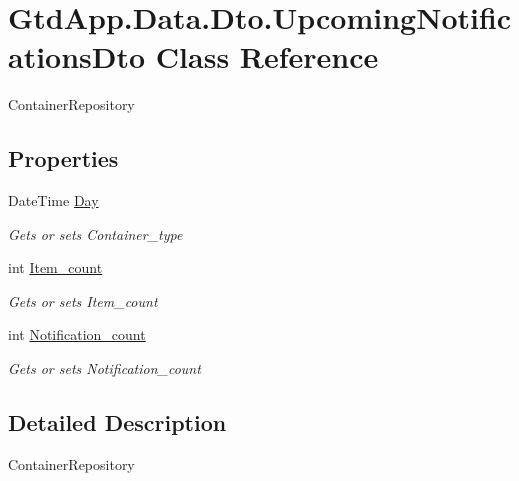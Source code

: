 \hypertarget{class_gtd_app_1_1_data_1_1_dto_1_1_upcoming_notifications_dto}{}\section{Gtd\+App.\+Data.\+Dto.\+Upcoming\+Notifications\+Dto Class Reference}
\label{class_gtd_app_1_1_data_1_1_dto_1_1_upcoming_notifications_dto}


Container\+Repository  


\subsection*{Properties}
\begin{DoxyCompactItemize}
\item 
Date\+Time \mbox{\hyperlink{class_gtd_app_1_1_data_1_1_dto_1_1_upcoming_notifications_dto_a553e1afb110f45555604ce1da782f741}{Day}}
\begin{DoxyCompactList}\small\item\em Gets or sets Container\+\_\+type \end{DoxyCompactList}\item 
int \mbox{\hyperlink{class_gtd_app_1_1_data_1_1_dto_1_1_upcoming_notifications_dto_acd9f0176dd1da453e5dd2d11fd68eafe}{Item\+\_\+count}}
\begin{DoxyCompactList}\small\item\em Gets or sets Item\+\_\+count \end{DoxyCompactList}\item 
int \mbox{\hyperlink{class_gtd_app_1_1_data_1_1_dto_1_1_upcoming_notifications_dto_a3f46ebac8f642e226e2ba03eaea53323}{Notification\+\_\+count}}
\begin{DoxyCompactList}\small\item\em Gets or sets Notification\+\_\+count \end{DoxyCompactList}\end{DoxyCompactItemize}


\subsection{Detailed Description}
Container\+Repository 



